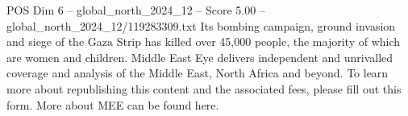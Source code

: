 \begin{textsample}{POS Dim 6 – global\_north\_2024\_12 – Score 5.00 – global\_north\_2024\_12/119283309.txt}
Its bombing campaign, ground invasion and siege of the Gaza Strip has killed over 45,000 people, the majority of which are women and children.
Middle East Eye delivers independent and unrivalled coverage and analysis of the Middle East, North Africa and beyond.
To learn more about republishing this content and the associated fees, please fill out this form.
More about MEE can be found here.

\end{textsample}
